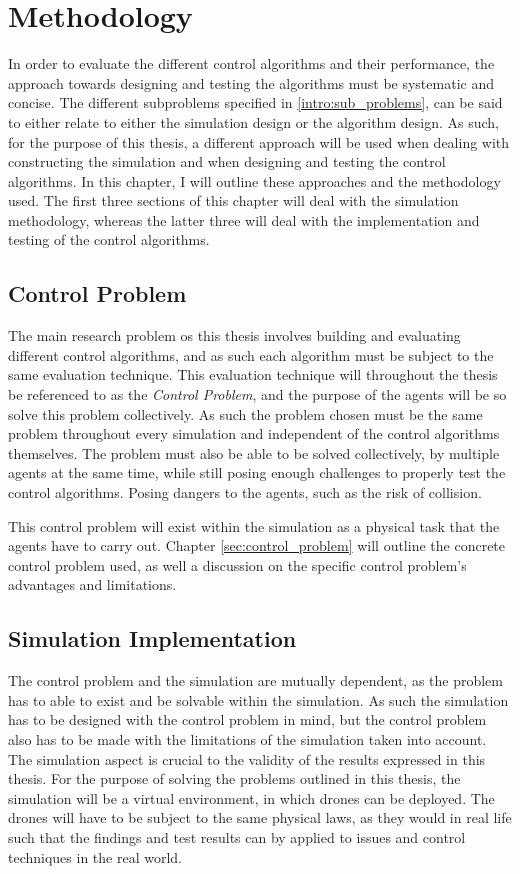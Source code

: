 
\chapter{Methodology}
In order to evaluate the different control algorithms and their performance, the approach towards designing and testing the algorithms must be systematic and concise. 
The different subproblems specified in \ref{intro:sub_problems}, can be said to either relate to either the simulation design or the algorithm design. As such, for the purpose of this thesis, a different approach will be used when dealing with constructing the simulation and when designing and testing the control algorithms. In this chapter, I will outline these approaches and the methodology used. The first three sections of this chapter will deal with the simulation methodology, whereas the latter three will deal with the implementation and testing of the control algorithms. 

\section{Control Problem}
The main research problem os this thesis involves building and evaluating different control algorithms, and as such each algorithm must be subject to the same evaluation technique.
This evaluation technique will throughout the thesis be referenced to as the \textit{Control Problem}, and the purpose of the agents will be so solve this problem collectively. 
As such the problem chosen must be the same problem throughout every simulation and independent of the control algorithms themselves. The problem must also be able to be solved collectively, by multiple agents at the same time, while still posing enough challenges to properly test the control algorithms. Posing dangers to the agents, such as the risk of collision. 

This control problem will exist within the simulation as a physical task that the agents have to carry out. Chapter \ref{sec:control_problem} will outline the concrete control problem used, as well a discussion on the specific control problem's advantages and limitations. 

\section{Simulation Implementation}
The control problem and the simulation are mutually dependent, as the problem has to able to exist and be solvable within the simulation. As such the simulation has to be designed with the control problem in mind, but the control problem also has to be made with the limitations of the simulation taken into account. The simulation aspect is crucial to the validity of the results expressed in this thesis. For the purpose of solving the problems outlined in this thesis, the simulation will be a virtual environment, in which drones can be deployed. The drones will have to be subject to the same physical laws, as they would in real life such that the findings and test results can by applied to issues and control techniques in the real world.

